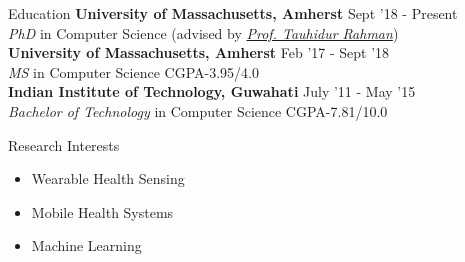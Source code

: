\documentclass{resume} %
\begin{document}
\vspace*{-1mm}
\begin{rSection}{Education}
{\bf University of Massachusetts, Amherst} \hfill {Sept '18 - Present} \\ \textit{PhD} in Computer Science (advised by \textit{\href{http://www.tauhidurrahman.com/}{Prof. Tauhidur Rahman}}) \\
{\bf University of Massachusetts, Amherst} \hfill {Feb '17 - Sept '18} \\ \textit{MS} in Computer Science \hfill CGPA-3.95/4.0 \\
{\bf Indian Institute of Technology, Guwahati} \hfill {July '11 - May '15} \\ 
\textit{Bachelor of Technology} in  Computer Science \hfill CGPA-7.81/10.0 \\

\end{rSection}
\vspace*{-0.5mm}
\begin{rSection}{Research Interests}
\begin{itemize}[leftmargin=*]
\itemsep -0.5em 
\item Wearable Health Sensing
\item Mobile Health Systems
\item Machine Learning

\end{itemize}

\end{rSection}
\end{document}
